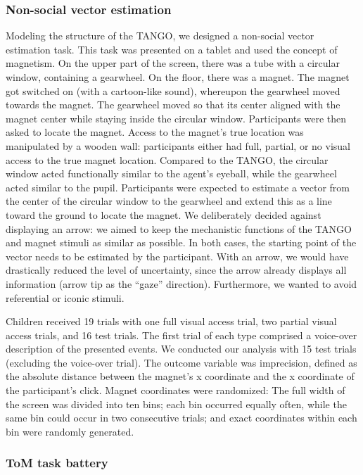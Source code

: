 \documentclass[
  man,mask,floatsintext]{apa7}
\begin{document}
\hypertarget{non-social-vector-estimation}{%
\subsubsection{Non-social vector estimation}\label{non-social-vector-estimation}}

Modeling the structure of the TANGO, we designed a non-social vector estimation task. This task was presented on a tablet and used the concept of magnetism. On the upper part of the screen, there was a tube with a circular window, containing a gearwheel. On the floor, there was a magnet. The magnet got switched on (with a cartoon-like sound), whereupon the gearwheel moved towards the magnet. The gearwheel moved so that its center aligned with the magnet center while staying inside the circular window. Participants were then asked to locate the magnet. Access to the magnet's true location was manipulated by a wooden wall: participants either had full, partial, or no visual access to the true magnet location. Compared to the TANGO, the circular window acted functionally similar to the agent's eyeball, while the gearwheel acted similar to the pupil. Participants were expected to estimate a vector from the center of the circular window to the gearwheel and extend this as a line toward the ground to locate the magnet. We deliberately decided against displaying an arrow: we aimed to keep the mechanistic functions of the TANGO and magnet stimuli as similar as possible. In both cases, the starting point of the vector needs to be estimated by the participant. With an arrow, we would have drastically reduced the level of uncertainty, since the arrow already displays all information (arrow tip as the ``gaze'' direction). Furthermore, we wanted to avoid referential or iconic stimuli.

Children received 19 trials with one full visual access trial, two partial visual access trials, and 16 test trials. The first trial of each type comprised a voice-over description of the presented events. We conducted our analysis with 15 test trials (excluding the voice-over trial). The outcome variable was imprecision, defined as the absolute distance between the magnet's x coordinate and the x coordinate of the participant's click. Magnet coordinates were randomized: The full width of the screen was divided into ten bins; each bin occurred equally often, while the same bin could occur in two consecutive trials; and exact coordinates within each bin were randomly generated.

\hypertarget{tom-task-battery}{%
\subsubsection{ToM task battery}\label{tom-task-battery}}
\end{document}

